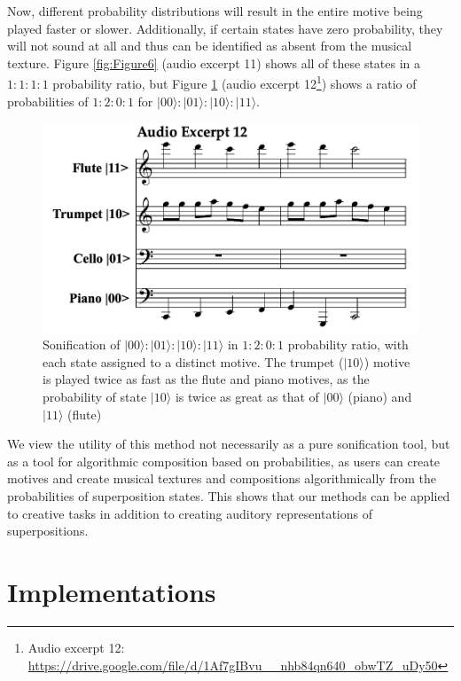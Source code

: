 \documentclass[10pt,twocolumn]{article}
\begin{document}
Now, different probability distributions will result in the entire motive being played faster or slower. Additionally, if certain states have zero probability, they will not sound at all and thus can be identified as absent from the musical texture. Figure \ref{fig:Figure6} (audio excerpt 11) shows all of these states in a $1:1:1:1$ probability ratio, but Figure \ref{fig:Figure7} (audio excerpt 12\footnote{Audio excerpt 12: \url{https://drive.google.com/file/d/1Af7gIBvu__nhb84qn640_obwTZ_uDy50}}) shows a ratio of probabilities of $1:2:0:1$ for $|00\rangle : |01\rangle : |10\rangle : |11\rangle$.

\begin{figure}[h]
\centering
  \includegraphics[width=.45\textwidth]{fig/Figure 7.png}
        \caption{Sonification of $|00\rangle : |01\rangle : |10\rangle : |11\rangle$ in $1:2:0:1$ probability ratio, with each state assigned to a distinct motive. The trumpet ($|10\rangle$) motive is played twice as fast as the flute and piano motives, as the probability of state $|10\rangle$ is twice as great as that of $|00\rangle$ (piano) and $|11\rangle$ (flute)}
\label{fig:Figure7}
\end{figure}

We view the utility of this method not necessarily as a pure sonification tool, but as a tool for 
algorithmic composition based on probabilities, as users can create motives and create musical textures and compositions algorithmically from the probabilities of superposition states. This shows that our methods can be applied to creative tasks in addition to creating auditory representations of superpositions.

\section{Implementations} \label{sec:Implementations}
\end{document}
